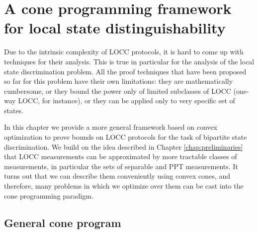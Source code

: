 \chapter{A cone programming framework for local state distinguishability}
\label{chap:programs}

Due to the intrinsic complexity of LOCC protocols, it is hard 
to come up with techniques for their analysis.
This is true in particular for the analysis of the local state discrimination 
problem. All the proof techniques that have been proposed so far for this problem 
have their own limitations: they are mathematically cumbersome, or they bound the 
power only of limited subclasses of LOCC (one-way LOCC, for instance), or they 
can be applied only to very specific set of states. 

In this chapter we provide a more general framework based on convex optimization 
to prove bounds on LOCC protocols for the task of bipartite state discrimination.
We build on the idea described in Chapter \ref{chap:preliminaries} that LOCC 
measurements can be approximated by more tractable classes of measurements, 
in particular the sets of separable and PPT measurements.
It turns out that we can describe them conveniently using convex cones, 
and therefore, many problems in which we optimize over them can be cast 
into the cone programming paradigm. 

\minitoc

\section{General cone program}

